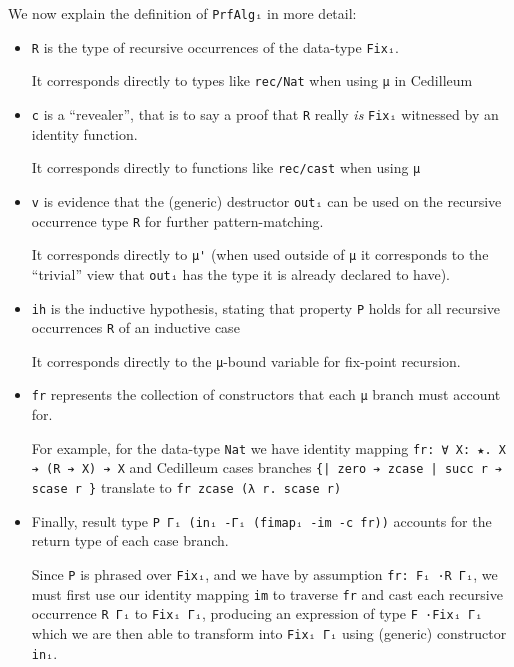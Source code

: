 \documentclass{article}
\begin{document}
We now explain the definition of \verb;PrfAlgᵢ; in more detail:
\begin{itemize}
  \item \verb;R; is the type of recursive occurrences of the data-type
    \verb;Fixᵢ;.

    It corresponds directly to types like \verb;rec/Nat; when using
    \verb;μ; in Cedilleum
  \item \verb;c; is a ``revealer'', that is to say a proof that \verb;R; really
    \textit{is} \verb;Fixᵢ; witnessed by an identity function.

    It corresponds directly to functions like \verb;rec/cast; when using \verb;μ;
  \item \verb;v; is evidence that the (generic) destructor \verb;outᵢ; can be
    used on the recursive occurrence type \verb;R; for further pattern-matching.

    It corresponds directly to \verb;μ'; (when used outside of \verb;μ; it
    corresponds to the ``trivial'' view that \verb;outᵢ; has the type it is
    already declared to have).

  \item \verb;ih; is the inductive hypothesis, stating that property \verb;P;
    holds for all recursive occurrences \verb;R; of an inductive case

    It corresponds directly to the \verb;μ;-bound variable for fix-point recursion.
  \item \verb;fr; represents the collection of constructors that each \verb;μ;
    branch must account for.

    For example, for the data-type \verb;Nat; we have identity mapping
    \verb;fr: ∀ X: ★. X ➔ (R ➔ X) ➔ X; and Cedilleum cases branches
    \verb;{| zero ➔ zcase | succ r ➔ scase r }; translate to
    \verb;fr zcase (λ r. scase r);

  \item Finally, result type \verb;P Γᵢ (inᵢ -Γᵢ (fimapᵢ -im -c fr)); accounts
    for the return type of each case branch.

    Since \verb;P; is phrased over \verb;Fixᵢ;, and we have by assumption
    \verb;fr: Fᵢ ·R Γᵢ;, we must first use our identity mapping \verb;im; to
    traverse \verb;fr; and cast each recursive occurrence \verb;R Γᵢ; to
    \verb;Fixᵢ Γᵢ;, producing an expression of type \verb;F ·Fixᵢ Γᵢ; which we are
    then able to transform into \verb;Fixᵢ Γᵢ; using (generic) constructor \verb;inᵢ;.
\end{itemize}
\end{document}
